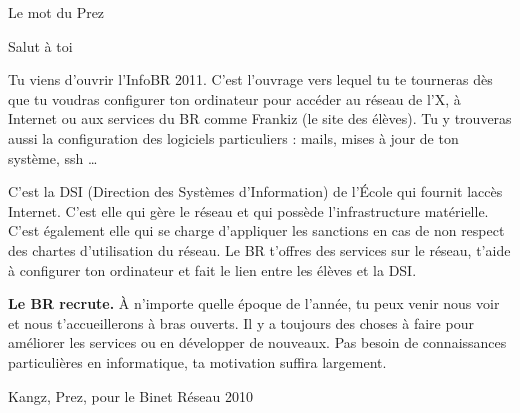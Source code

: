 

\begin{center}
    { \Huge Le mot du Prez }
\end{center}

Salut \`a toi

Tu viens d'ouvrir l'InfoBR 2011. C'est l'ouvrage vers lequel tu te tourneras d\`es que tu voudras configurer ton ordinateur pour acc\'eder au r\'eseau de l'X, \`a Internet ou aux services du BR comme Frankiz (le site des \'el\`eves). Tu y trouveras aussi la configuration des logiciels particuliers : mails, mises \`a jour de ton syst\`eme, ssh \dots
{}

C'est la DSI (Direction des Syst\`emes d'Information) de l'\'Ecole qui fournit lacc\`es Internet. C'est elle qui g\`ere le r\'eseau et qui poss\`ede l'infrastructure mat\'erielle. C'est \'egalement elle qui se charge d'appliquer les sanctions en cas de non respect des chartes d'utilisation du r\'eseau. Le BR t'offres des services sur le r\'eseau, t'aide \`a configurer ton ordinateur et fait le lien entre les \'el\`eves et la DSI.

\textbf{Le BR recrute.} \`A n'importe quelle \'epoque de l'ann\'ee, tu peux venir nous voir et nous t'accueillerons \`a bras ouverts. Il y a toujours des choses \`a faire pour am\'eliorer les services ou en d\'evelopper de nouveaux. Pas besoin de connaissances particuli\`eres en informatique, ta motivation suffira largement.

\begin{flushright}
    Kangz, Prez, pour le Binet R\'eseau 2010
\end{flushright}

